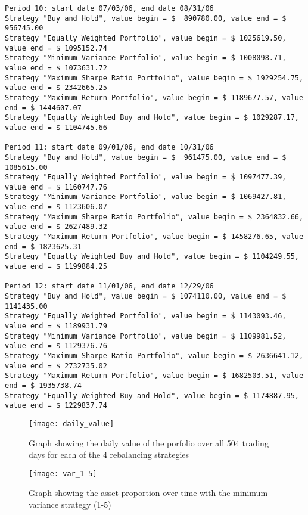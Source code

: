 \documentclass[english]{scrartcl}
\begin{document}
\begin{verbatim}
Period 10: start date 07/03/06, end date 08/31/06
Strategy "Buy and Hold", value begin = $  890780.00, value end = $  956745.00
Strategy "Equally Weighted Portfolio", value begin = $ 1025619.50, value end = $ 1095152.74
Strategy "Minimum Variance Portfolio", value begin = $ 1008098.71, value end = $ 1073631.72
Strategy "Maximum Sharpe Ratio Portfolio", value begin = $ 1929254.75, value end = $ 2342665.25
Strategy "Maximum Return Portfolio", value begin = $ 1189677.57, value end = $ 1444607.07
Strategy "Equally Weighted Buy and Hold", value begin = $ 1029287.17, value end = $ 1104745.66

Period 11: start date 09/01/06, end date 10/31/06
Strategy "Buy and Hold", value begin = $  961475.00, value end = $ 1085615.00
Strategy "Equally Weighted Portfolio", value begin = $ 1097477.39, value end = $ 1160747.76
Strategy "Minimum Variance Portfolio", value begin = $ 1069427.81, value end = $ 1123606.07
Strategy "Maximum Sharpe Ratio Portfolio", value begin = $ 2364832.66, value end = $ 2627489.32
Strategy "Maximum Return Portfolio", value begin = $ 1458276.65, value end = $ 1823625.31
Strategy "Equally Weighted Buy and Hold", value begin = $ 1104249.55, value end = $ 1199884.25

Period 12: start date 11/01/06, end date 12/29/06
Strategy "Buy and Hold", value begin = $ 1074110.00, value end = $ 1141435.00
Strategy "Equally Weighted Portfolio", value begin = $ 1143093.46, value end = $ 1189931.79
Strategy "Minimum Variance Portfolio", value begin = $ 1109981.52, value end = $ 1129376.76
Strategy "Maximum Sharpe Ratio Portfolio", value begin = $ 2636641.12, value end = $ 2732735.02
Strategy "Maximum Return Portfolio", value begin = $ 1682503.51, value end = $ 1935738.74
Strategy "Equally Weighted Buy and Hold", value begin = $ 1174887.95, value end = $ 1229837.74

	\end{verbatim}
	
	\begin{figure}[!htb]
		\begin{center}
			\texttt{[image: daily\_value]}
			
		\end{center}
		\caption{Graph showing the daily value of the porfolio over all 504 trading days for each of the 4 rebalancing strategies}
		\vspace{-10pt}
	\end{figure}
	
		\begin{figure}[!htb]
			\begin{center}
				\texttt{[image: var\_1-5]}
				
			\end{center}
			\caption{Graph showing the asset proportion over time with the minimum variance strategy (1-5)}
			\vspace{-10pt}
		\end{figure}
		
\end{document}
